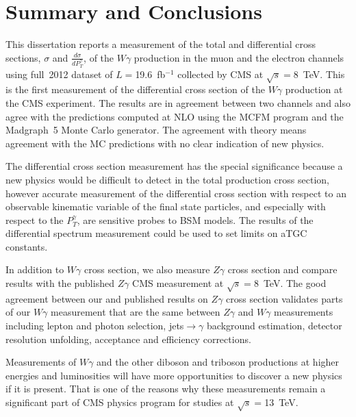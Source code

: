 \chapter{Summary and Conclusions}
\label{sec:Conclusions}

This dissertation reports a measurement of the total and differential cross sections, $\sigma$ and $\frac{d\sigma}{dP_T^{\gamma}}$, of the $W\gamma$ production in the muon and the electron channels using full~2012 dataset of $L=$19.6~fb$^{-1}$ collected by CMS at $\sqrt{s}=$8~TeV. This is the first measurement of the differential cross section of the $W\gamma$ production at the CMS experiment. The results are in agreement between two channels and also agree with the predictions computed at NLO using the MCFM program and the Madgraph~5 Monte Carlo generator. The agreement with theory means agreement with the MC predictions with no clear indication of new physics.

The differential cross section measurement has the special significance because a new physics would be difficult to detect in the total production cross section, however accurate measurement of the differential cross section with respect to an observable kinematic variable of the final state particles, and especially with respect to the $P_T^{\gamma}$, are sensitive probes to BSM models. The results of the differential spectrum measurement could be used to set limits on aTGC constants.

In addition to $W\gamma$ cross section, we also measure $Z\gamma$ cross section and compare results with the published $Z\gamma$ CMS measurement at $\sqrt{s}=$8~TeV. The good agreement between our and published results on $Z\gamma$ cross section validates parts of our $W\gamma$ measurement that are the same between $Z\gamma$ and $W\gamma$ measurements including lepton and photon selection, jets$\rightarrow\gamma$ background estimation, detector resolution unfolding, acceptance and efficiency corrections.

Measurements of $W\gamma$ and the other diboson and triboson productions at higher energies and luminosities will have more opportunities to discover a new physics if it is present. That is one of the reasons why these measurements remain a significant part of CMS physics program for studies at $\sqrt{s}=$13~TeV.

